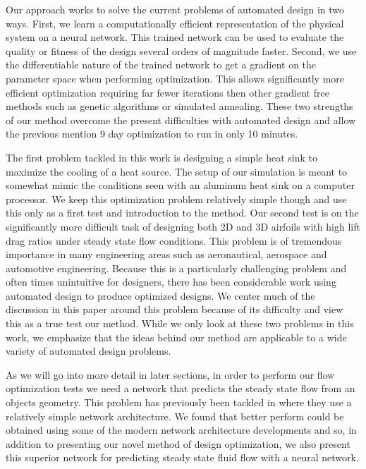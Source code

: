 \documentclass{article} %
\begin{document}
Our approach works to solve the current problems of automated design in two ways. First, we learn a computationally efficient representation of the physical system on a neural network. This trained network can be used to evaluate the quality or fitness of the design several orders of magnitude faster. Second, we use the differentiable nature of the trained network to get a gradient on the parameter space when performing optimization. This allows significantly more efficient optimization requiring far fewer iterations then other gradient free methods such as genetic algorithms or simulated annealing. These two strengths of our method overcome the present difficulties with automated design and allow the previous mention 9 day optimization to run in only 10 minutes. 

The first problem tackled in this work is designing a simple heat sink to maximize the cooling of a heat source. The setup of our simulation is meant to somewhat mimic the conditions seen with an aluminum heat sink on a computer processor. We keep this optimization problem relatively simple though and use this only as a first test and introduction to the method. Our second test is on the significantly more difficult task of designing both 2D and 3D airfoils with high lift drag ratios under steady state flow conditions. This problem is of tremendous importance in many engineering areas such as aeronautical, aerospace and automotive engineering. Because this is a particularly challenging problem and often times unintuitive for designers, there has been considerable work using automated design to produce optimized designs. We center much of the discussion in this paper around this problem because of its difficulty and view this as a true test our method. While we only look at these two problems in this work, we emphasize that the ideas behind our method are applicable to a wide variety of automated design problems.

As we will go into more detail in later sections, in order to perform our flow optimization tests we need a network that predicts the steady state flow from an objects geometry. This problem has previously been tackled in \citep{guo2016convolutional} where they use a relatively simple network architecture. We found that better perform could be obtained using some of the modern network architecture developments and so, in addition to presenting our novel method of design optimization, we also present this superior network for predicting steady state fluid flow with a neural network.
\end{document}

